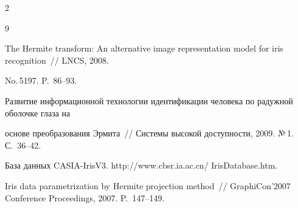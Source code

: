 \begin{multicols}{2}
{{\begin{thebibliography}{9}




The Hermite transform: An alternative image representation model for iris recognition~// LNCS, 2008. 


No.\,5197. P.~86--93.












Развитие информационной технологии идентификации человека по радужной оболочке глаза на 


основе преобразования Эрмита~// Системы высокой доступности, 2009. №\,1. С.~36--42.







База данных CASIA-IrisV3. {\sf  http://www.cbsr.ia.ac.cn/ IrisDatabase.htm}.





\label{end\stat}









Iris data parametrization by Hermite projection method~// GraphiCon'2007 Conference Proceedings, 2007. P.~147--149. 


 \end{thebibliography}


}


}


\end{multicols}








        


